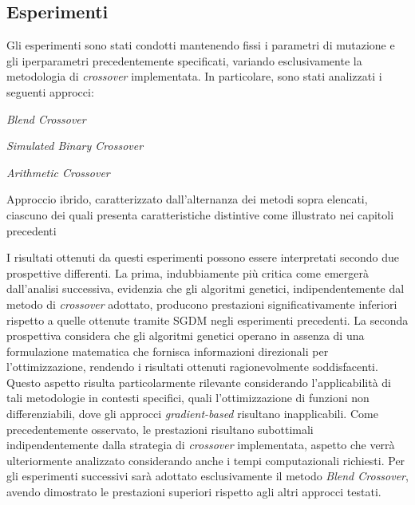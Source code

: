 \subsection{Esperimenti}
Gli esperimenti sono stati condotti mantenendo fissi i parametri di mutazione e gli iperparametri precedentemente specificati, variando esclusivamente la metodologia di \textit{crossover} implementata. In particolare, sono stati analizzati i seguenti approcci:

\begin{compactitemize}
    \item \textit{Blend Crossover}
    \item \textit{Simulated Binary Crossover}
    \item \textit{Arithmetic Crossover}
    \item Approccio ibrido, caratterizzato dall'alternanza dei metodi sopra elencati, ciascuno dei quali presenta caratteristiche distintive come illustrato nei capitoli precedenti
\end{compactitemize}

I risultati ottenuti da questi esperimenti possono essere interpretati secondo due prospettive differenti. La prima, indubbiamente più critica come emergerà dall'analisi successiva, evidenzia che gli algoritmi genetici, indipendentemente dal metodo di \textit{crossover} adottato, producono prestazioni significativamente inferiori rispetto a quelle ottenute tramite SGDM negli esperimenti precedenti. 
La seconda prospettiva considera che gli algoritmi genetici operano in assenza di una formulazione matematica che fornisca informazioni direzionali per l'ottimizzazione, rendendo i risultati ottenuti ragionevolmente soddisfacenti. Questo aspetto risulta particolarmente rilevante considerando l'applicabilità di tali metodologie in contesti specifici, quali l'ottimizzazione di funzioni non differenziabili, dove gli approcci \textit{gradient-based} risultano inapplicabili.
Come precedentemente osservato, le prestazioni risultano subottimali indipendentemente dalla strategia di \textit{crossover} implementata, aspetto che verrà ulteriormente analizzato considerando anche i tempi computazionali richiesti. Per gli esperimenti successivi sarà adottato esclusivamente il metodo \textit{Blend Crossover}, avendo dimostrato le prestazioni superiori rispetto agli altri approcci testati.


